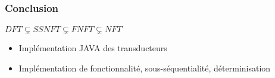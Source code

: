 \frametitle{Conclusion}
\framesubtitle{}

\begin{center}
\LARGE{$DFT \subsetneq SSNFT \subsetneq FNFT \subsetneq NFT$}
\end{center}

\begin{itemize}
	\item Implémentation JAVA des transducteurs
	\item Implémentation de fonctionnalité, sous-séquentialité, déterminisation
\end{itemize}